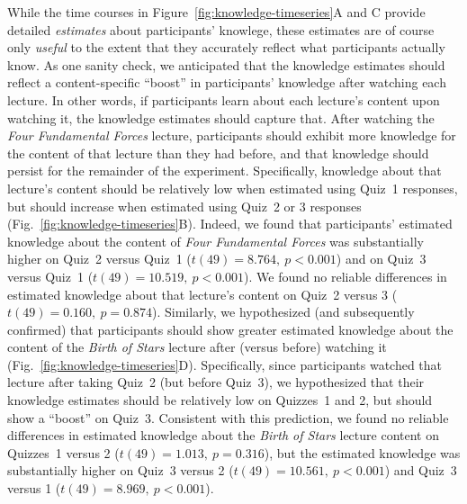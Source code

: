 \documentclass[10pt]{article}
\begin{document}
While the time courses in Figure~\ref{fig:knowledge-timeseries}A and C provide
detailed \textit{estimates} about participants' knowlege, these estimates are
of course only \textit{useful} to the extent that they accurately reflect what
participants actually know. As one sanity check, we anticipated that the
knowledge estimates should reflect a content-specific ``boost'' in
participants' knowledge after watching each lecture. In other words, if
participants learn about each lecture's content upon watching it,
the knowledge estimates should capture that. After watching the \textit{Four
Fundamental Forces} lecture, participants should exhibit more knowledge for the
content of that lecture than they had before, and that knowledge should persist
for the remainder of the experiment. Specifically, knowledge about that
lecture's content should be relatively low when estimated using Quiz~1
responses, but should increase when estimated using Quiz~2 or 3 responses
(Fig.~\ref{fig:knowledge-timeseries}B). Indeed, we found that participants'
estimated knowledge about the content of \textit{Four Fundamental Forces}
was substantially higher on Quiz~2 versus Quiz~1 ($t(49) = 8.764,~p < 0.001$)
and on Quiz~3 versus Quiz~1 ($t(49) = 10.519,~p < 0.001$). We found no reliable
differences in estimated knowledge about that lecture's content on Quiz~2
versus 3 ($t(49) = 0.160,~p = 0.874$). Similarly, we hypothesized (and
subsequently confirmed) that participants should show greater estimated
knowledge about the content of the \textit{Birth of Stars} lecture after
(versus before) watching it (Fig.~\ref{fig:knowledge-timeseries}D).
Specifically, since participants watched that lecture after taking Quiz~2 (but
before Quiz~3), we hypothesized that their knowledge estimates should be
relatively low on Quizzes~1 and 2, but should show a ``boost'' on Quiz~3.
Consistent with this prediction, we found no reliable differences in estimated
knowledge about the \textit{Birth of Stars} lecture content on Quizzes~1 versus
2 ($t(49) = 1.013,~p = 0.316$), but the estimated knowledge was substantially
higher on Quiz~3 versus 2 ($t(49) = 10.561,~p < 0.001$) and Quiz~3 versus 1
($t(49) = 8.969,~p < 0.001$).
\end{document}
